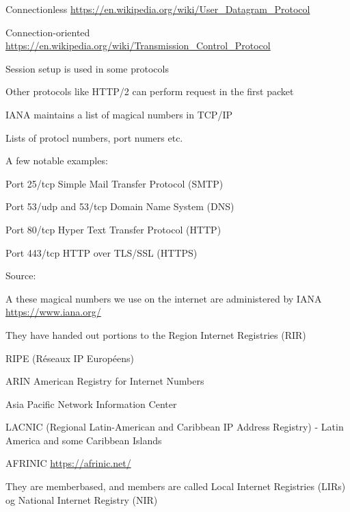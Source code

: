 \documentclass[Screen16to9,17pt]{foils}
\begin{document}
Connectionless \url{https://en.wikipedia.org/wiki/User_Datagram_Protocol}



Connection-oriented \url{https://en.wikipedia.org/wiki/Transmission_Control_Protocol}




\begin{list2}
\item Session setup is used in some protocols
\item Other protocols like HTTP/2 can perform request in the first packet
\end{list2}




\begin{list1}
\item IANA maintains a list of magical numbers in TCP/IP
\item Lists of protocl numbers, port numers etc.
\item A few notable examples:
\begin{list2}
\item Port 25/tcp Simple Mail Transfer Protocol (SMTP)
\item Port 53/udp and 53/tcp Domain Name System (DNS)
\item Port 80/tcp Hyper Text Transfer Protocol (HTTP)
\item Port 443/tcp HTTP over TLS/SSL (HTTPS)
\end{list2}
\item Source: 
\end{list1}



\begin{list1}
\item A these magical numbers we use on the internet are administered by IANA \url{https://www.iana.org/}
\item They have handed out portions to the Region Internet Registries (RIR)
\begin{list2}
\item RIPE (Réseaux IP Européens)  
\item ARIN American Registry for Internet Numbers 
\item Asia Pacific Network Information Center 
\item LACNIC (Regional Latin-American and Caribbean IP Address Registry) - Latin America and some Caribbean Islands
\end{list2}
\item AFRINIC \url{https://afrinic.net/}
\item They are memberbased, and members are called Local Internet Registries (LIRs) og National Internet Registry (NIR)
\end{list1}
\end{document}
